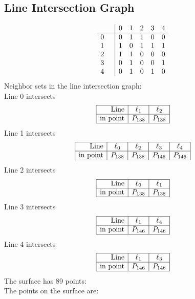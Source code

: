 \documentclass{article}
\begin{document}
{\subsection*{Line Intersection Graph}
{\arraycolsep=1pt
$$
\begin{array}{rr|*{5}r}
 &  & 0 & 1 & 2 & 3 & 4\\
\hline
0 &  & 0 & 1 & 1 & 0 & 0\\
1 &  & 1 & 0 & 1 & 1 & 1\\
2 &  & 1 & 1 & 0 & 0 & 0\\
3 &  & 0 & 1 & 0 & 0 & 1\\
4 &  & 0 & 1 & 0 & 1 & 0\\
\end{array}
$$
}%
Neighbor sets in the line intersection graph:\\
Line 0 intersects 
$$
\begin{array}{|r*{2}{|c}|}
\hline
\mbox{Line}  & \ell_{1} & \ell_{2}\\
\hline
\mbox{in point}  & P_{138} & P_{138}\\
\hline
\end{array}
$$
Line 1 intersects 
$$
\begin{array}{|r*{4}{|c}|}
\hline
\mbox{Line}  & \ell_{0} & \ell_{2} & \ell_{3} & \ell_{4}\\
\hline
\mbox{in point}  & P_{138} & P_{138} & P_{146} & P_{146}\\
\hline
\end{array}
$$
Line 2 intersects 
$$
\begin{array}{|r*{2}{|c}|}
\hline
\mbox{Line}  & \ell_{0} & \ell_{1}\\
\hline
\mbox{in point}  & P_{138} & P_{138}\\
\hline
\end{array}
$$
Line 3 intersects 
$$
\begin{array}{|r*{2}{|c}|}
\hline
\mbox{Line}  & \ell_{1} & \ell_{4}\\
\hline
\mbox{in point}  & P_{146} & P_{146}\\
\hline
\end{array}
$$
Line 4 intersects 
$$
\begin{array}{|r*{2}{|c}|}
\hline
\mbox{Line}  & \ell_{1} & \ell_{3}\\
\hline
\mbox{in point}  & P_{146} & P_{146}\\
\hline
\end{array}
$$
The surface has 89 points:\\
The points on the surface are:\\
}
\end{document}
